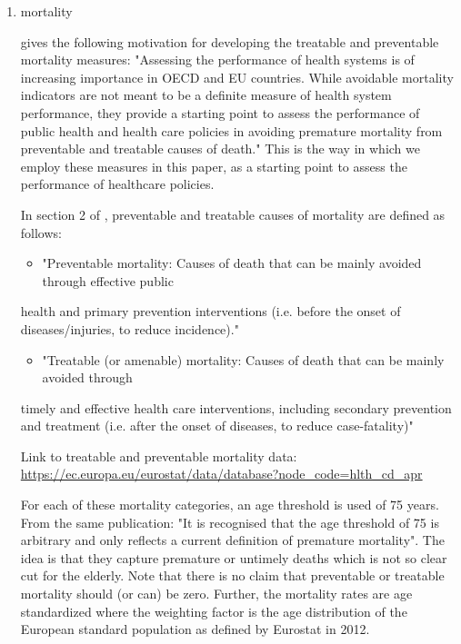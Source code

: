 \documentclass{article}
\begin{document}
\begin{enumerate}
\item mortality
\label{sec:orgc7cad5f}
\label{sec:mortality}

\cite{OECD_avoidable_mortality} gives the following motivation for developing the treatable and preventable mortality measures: "Assessing the performance of health systems is of increasing importance in OECD and EU countries. While avoidable mortality indicators are not meant to be a definite measure of health system performance, they provide a starting point to assess the performance of public health and health care policies in avoiding premature mortality from preventable and treatable causes of death." This is the way in which we employ these measures in this paper, as a starting point to assess the performance of healthcare policies. 

In section 2 of \cite{OECD_avoidable_mortality}, preventable and treatable causes of mortality are defined as follows:
\begin{itemize}
\item "Preventable mortality: Causes of death that can be mainly avoided through effective public
\end{itemize}
health and primary prevention interventions (i.e. before the onset of diseases/injuries, to
reduce incidence)."
\begin{itemize}
\item "Treatable (or amenable) mortality: Causes of death that can be mainly avoided through
\end{itemize}
timely and effective health care interventions, including secondary prevention and treatment
(i.e. after the onset of diseases, to reduce case-fatality)"

Link to treatable and preventable mortality data: \url{https://ec.europa.eu/eurostat/data/database?node\_code=hlth\_cd\_apr}

For each of these mortality categories, an age threshold is used of 75 years. From the same publication: "It is recognised that the age threshold of 75 is arbitrary and only reflects a current definition of premature mortality". The idea is that they capture premature or untimely deaths which is not so clear cut for the elderly. Note that there is no claim that preventable or treatable mortality should (or can) be zero. Further, the mortality rates are age standardized where the weighting factor is the age distribution of the European standard population as defined by Eurostat in 2012.


\end{enumerate}
\end{document}
